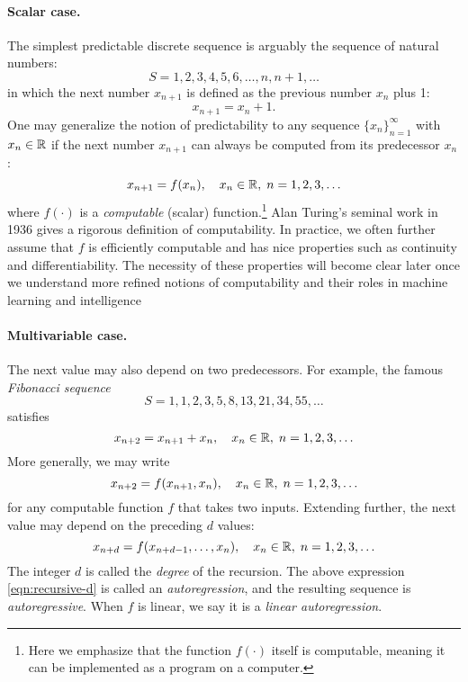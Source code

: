 \documentclass[../../book-main.tex]{subfiles}
\begin{document}
\paragraph{Scalar case.} The simplest predictable discrete sequence is arguably the sequence of natural numbers:
\begin{equation}
   S = 1, 2, 3, 4, 5, 6, \ldots, n, n+1, \ldots
\end{equation}
in which the next number $x_{n+1}$ is defined as the previous number $x_{n}$ plus 1:
\begin{equation}
    x_{n+1} = x_{n} + 1.    
\end{equation}
One may generalize the notion of predictability to any sequence $\{x_{n}\}_{n=1}^\infty$ with $x_{n} \in \mathbb{R}$ if the next number $x_{n+1}$ can always be computed from its predecessor $x_{n}$:
\begin{equation}
    x_{n+1} = f(x_{n}), \quad x_{n} \in \mathbb{R}, \; n = 1, 2, 3, \ldots
\end{equation}
where $f(\cdot)$ is a \textit{computable} (scalar) function.\footnote{Here we emphasize that the function $f(\cdot)$ itself is computable, meaning it can be implemented as a program on a computer.} Alan Turing's seminal work in 1936 \cite{Turing-1936} gives a rigorous definition of computability. In practice, we often further assume that $f$ is efficiently computable and has nice properties such as continuity and differentiability. The necessity of these properties will become clear later once we understand more refined notions of computability and their roles in machine learning and intelligence

\paragraph{Multivariable case.}
The next value may also depend on two predecessors. For example, the famous \textit{Fibonacci sequence}
\begin{equation}
    S = 1, 1, 2, 3, 5, 8, 13, 21, 34, 55, \ldots
\end{equation}
satisfies
\begin{equation}
    x_{n+2} = x_{n+1} + x_{n}, \quad x_{n} \in \mathbb{R}, \; n = 1, 2, 3, \ldots
\end{equation}
More generally, we may write
\begin{equation}
    x_{n+2} = f(x_{n+1}, x_{n}), \quad x_{n} \in \mathbb{R}, \; n = 1, 2, 3, \ldots
\end{equation}
for any computable function $f$ that takes two inputs. Extending further, the next value may depend on the preceding $d$ values:
\begin{equation}
    x_{n+d} = f(x_{n+d-1}, \ldots, x_{n}), \quad x_{n} \in \mathbb{R}, \; n = 1, 2, 3, \ldots
    \label{eqn:recursive-d}
\end{equation}
The integer $d$ is called the \textit{degree} of the recursion. The above expression \eqref{eqn:recursive-d} is called an \textit{autoregression}, and the resulting sequence is \textit{autoregressive}. When $f$ is linear, we say it is a \textit{linear autoregression}.
\end{document}

